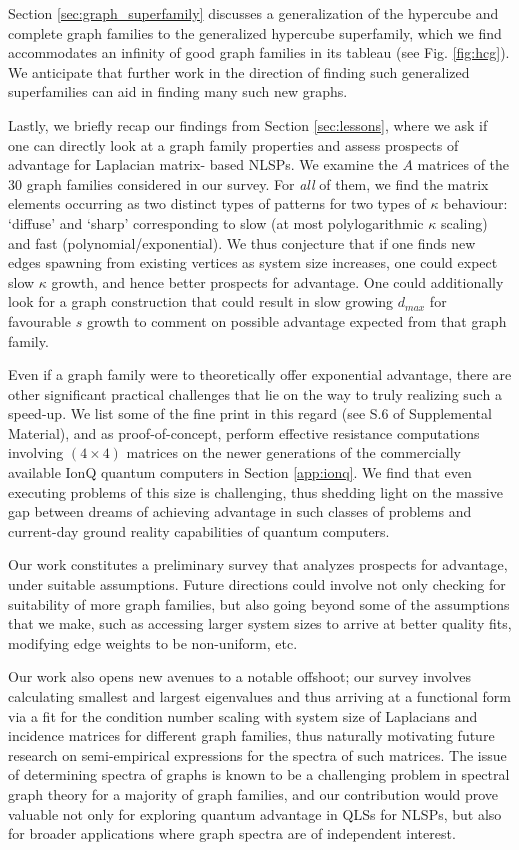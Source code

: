 \documentclass[%
 reprint,
 superscriptaddress,
 amsmath,amssymb,
 aps,
 pra,
floatfix,
nofootinbib,
]{revtex4-2}
\theoremstyle{definition}
\theoremstyle{remark}
\begin{document}
Section \ref{sec:graph_superfamily} discusses a generalization of the hypercube and complete graph families to the generalized hypercube superfamily, which we find accommodates an infinity of good graph families in its tableau (see Fig. \ref{fig:hcg}). We anticipate that further work in the direction of finding such generalized superfamilies can aid in finding many such new graphs.

Lastly, we briefly recap our findings from Section \ref{sec:lessons}, where we ask if one can directly look at a graph family properties and assess prospects of advantage for Laplacian matrix- based NLSPs. We examine the $A$ matrices of the 30 graph families considered in our survey. For \textit{all} of them, we find the matrix elements occurring as two distinct types of patterns for two types of $\kappa$ behaviour: `diffuse' and `sharp' corresponding to slow (at most polylogarithmic $\kappa$ scaling) and fast (polynomial/exponential). We thus conjecture that if one finds new edges spawning from existing vertices as system size increases, one could expect slow $\kappa$ growth, and hence better prospects for advantage. One could additionally look for a graph construction that could result in slow growing $d_{max}$ for favourable $s$ growth to comment on possible advantage expected from that graph family. 

Even if a graph family were to theoretically offer exponential advantage, there are other significant practical challenges that lie on the way to truly realizing such a speed-up. We list some of the fine print in this regard (see S.6 of Supplemental Material), and as proof-of-concept, perform effective resistance computations involving $(4\times 4)$ matrices on the newer generations of the commercially available IonQ quantum computers in Section \ref{app:ionq}. We find that even executing problems of this size is challenging, thus shedding light on the massive gap between dreams of achieving advantage in such classes of problems and current-day ground reality capabilities of quantum computers. 

Our work constitutes a preliminary survey that analyzes prospects for advantage, under suitable assumptions. Future directions could involve not only checking for suitability of more graph families, but also going beyond some of the assumptions that we make, such as accessing larger system sizes to arrive at better quality fits, modifying edge weights to be non-uniform, etc. 

Our work also opens new avenues to a notable offshoot; our survey involves calculating smallest and largest eigenvalues and thus arriving at a functional form via a fit for the condition number scaling with system size of Laplacians and incidence matrices for different graph families, thus naturally motivating future research on semi-empirical expressions for the spectra of such matrices. The issue of determining spectra of graphs is known to be a challenging problem in spectral graph theory for a majority of graph families, and our contribution would prove valuable not only for exploring quantum advantage in QLSs for NLSPs, but also for broader applications where graph spectra are of independent interest. 
\end{document}
